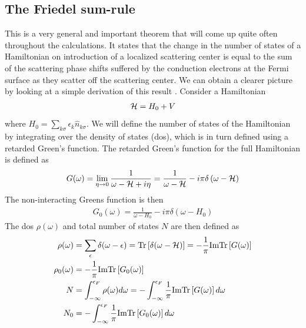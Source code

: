 \documentclass[12pt,twoside]{report}
\numberwithin{equation}{section}
\begin{document}
\subsection{The Friedel sum-rule}
This is a very general and important theorem that will come up  quite often throughout the calculations. It states that the change in the number of states of a Hamiltonian on introduction of a localized scattering center is equal to the sum of the scattering phase shifts suffered by the conduction electrons at the Fermi surface as they scatter off the scattering center. We can obtain a clearer picture by looking at a simple derivation of this result \cite{hewson}.
\pb Consider a Hamiltonian
\begin{equation}\begin{aligned}
	\mathcal{H} = H_0 + V
\end{aligned}\end{equation}
where \(H_0 = \sum_{k\sigma}\epsilon_k \hat n_{k\sigma}\). We will define the number of states of the Hamiltonian by integrating over the density of states (dos), which is in turn defined using a retarded Green's function. The retarded Green's function for the full Hamiltonian is defined as
\begin{equation}\begin{aligned}
	G(\omega) = \lim_{\eta \to 0}\frac{1}{\omega - \mathcal{H} + i\eta} = \frac{1}{\omega - \mathcal{H}} - i\pi\delta\left(\omega - \mathcal{H}\right)
\end{aligned}\end{equation}
The non-interacting Greens function is then
\begin{equation}\begin{aligned}
	G_0(\omega) = \frac{1}{\omega - H_0} - i\pi\delta\left(\omega - H_0\right)
\end{aligned}\end{equation}
The dos \(\rho(\omega)\) and total number of states \(N\) are then defined as
\begin{equation}\begin{aligned}
	\rho(\omega) &= \sum_\epsilon \delta(\omega - \epsilon) = \text{Tr}\left[ \delta(\omega - \mathcal{H}) \right] = - \frac{1}{\pi}\text{Im} \text{Tr}\left[ G(\omega) \right]\\
	\rho_0(\omega) &=  -\frac{1}{\pi}\text{Im} \text{Tr}\left[ G_0(\omega) \right]\\
	N &= \int_{-\infty}^{\epsilon_F} \rho(\omega) d\omega = - \int_{-\infty}^{\epsilon_F} \frac{1}{\pi}\text{Im} \text{Tr}\left[ G(\omega) \right]d\omega\\
	N_0 &= - \int_{-\infty}^{\epsilon_F} \frac{1}{\pi}\text{Im} \text{Tr}\left[ G_0(\omega) \right]d\omega
\end{aligned}\end{equation}
\end{document}
